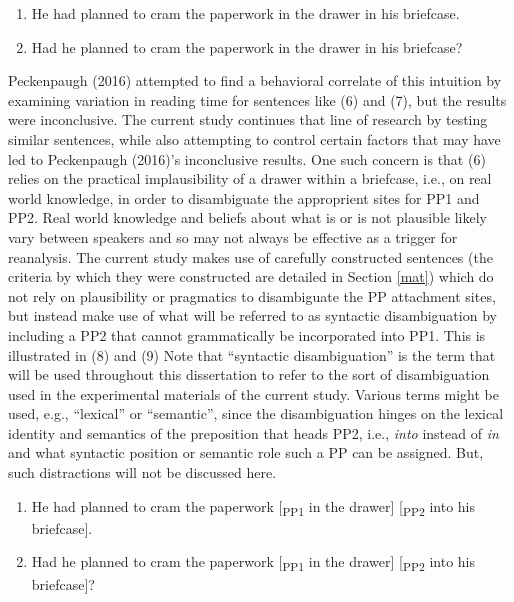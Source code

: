 \documentclass[12pt,oneside]{book}
\begin{document}
\begin{enumerate}
\def\labelenumi{(\arabic{enumi})}
\setcounter{enumi}{5}
\item
  He had planned to cram the paperwork in the drawer in his briefcase.
\item
  Had he planned to cram the paperwork in the drawer in his briefcase?
\end{enumerate}

Peckenpaugh (2016) attempted to find a behavioral correlate of this intuition by examining variation in reading time for sentences like (6) and (7), but the results were inconclusive. The current study continues that line of research by testing similar sentences, while also attempting to control certain factors that may have led to Peckenpaugh (2016)'s inconclusive results. One such concern is that (6) relies on the practical implausibility of a drawer within a briefcase, i.e., on real world knowledge, in order to disambiguate the approprient sites for PP1 and PP2. Real world knowledge and beliefs about what is or is not plausible likely vary between speakers and so may not always be effective as a trigger for reanalysis. The current study makes use of carefully constructed sentences (the criteria by which they were constructed are detailed in Section \ref{mat}) which do not rely on plausibility or pragmatics to disambiguate the PP attachment sites, but instead make use of what will be referred to as syntactic disambiguation by including a PP2 that cannot grammatically be incorporated into PP1. This is illustrated in (8) and (9) Note that ``syntactic disambiguation'' is the term that will be used throughout this dissertation to refer to the sort of disambiguation used in the experimental materials of the current study. Various terms might be used, e.g., ``lexical'' or ``semantic'', since the disambiguation hinges on the lexical identity and semantics of the preposition that heads PP2, i.e., \emph{into} instead of \emph{in} and what syntactic position or semantic role such a PP can be assigned. But, such distractions will not be discussed here.

\begin{enumerate}
\def\labelenumi{(\arabic{enumi})}
\setcounter{enumi}{7}
\item
  He had planned to cram the paperwork {[}\textsubscript{PP1} in the drawer{]} {[}\textsubscript{PP2} into his briefcase{]}.
\item
  Had he planned to cram the paperwork {[}\textsubscript{PP1} in the drawer{]} {[}\textsubscript{PP2} into his briefcase{]}?
\end{enumerate}
\end{document}
